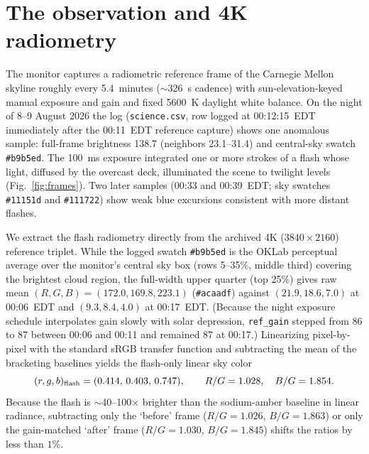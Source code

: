 \documentclass[11pt,a4paper]{article}
\newcommand{\code}[1]{\texttt{\small #1}}
\begin{document}
\section{The observation and 4K radiometry}
\label{sec:obs}
The monitor captures a radiometric reference frame of the Carnegie Mellon
skyline roughly every 5.4~minutes ($\sim$326~s cadence) with
sun-elevation-keyed manual exposure and gain and fixed 5600~K daylight white
balance. On the night of 8--9 August 2026 the log (\code{science.csv}, row
logged at 00:12:15~EDT immediately after the 00:11~EDT reference capture) shows
one anomalous sample: full-frame brightness 138.7 (neighbors 23.1--31.4) and
central-sky swatch \code{\#b9b5ed}. The 100~ms exposure integrated one or more
strokes of a flash whose light, diffused by the overcast deck, illuminated the
scene to twilight levels (Fig.~\ref{fig:frames}). Two later samples (00:33 and
00:39~EDT; sky swatches \code{\#11151d} and \code{\#111722}) show weak blue
excursions consistent with more distant flashes.

We extract the flash radiometry directly from the archived 4K
($3840\times 2160$) reference triplet. While the logged swatch \code{\#b9b5ed}
is the OKLab perceptual average over the monitor's central sky box (rows
5--35\%, middle third) covering the brightest cloud region, the full-width
upper quarter (top 25\%) gives raw mean $(R,G,B)=(172.0,169.8,223.1)$
(\code{\#acaadf}) against $(21.9,18.6,7.0)$ at 00:06~EDT and $(9.3,8.4,4.0)$
at 00:17~EDT. (Because the night exposure schedule interpolates gain slowly
with solar depression, \code{ref\_gain} stepped from 86 to 87 between 00:06
and 00:11 and remained 87 at 00:17.) Linearizing pixel-by-pixel with the
standard sRGB transfer function \citep{iec1999} and subtracting the mean of
the bracketing baselines yields the flash-only linear sky color
\begin{equation}
  (r,g,b)_{\rm flash} = (0.414,\,0.403,\,0.747), \qquad
  R/G = 1.028,\quad B/G = 1.854 .
  \label{eq:meas}
\end{equation}
Because the flash is $\sim$40--100$\times$ brighter than the sodium-amber
baseline in linear radiance, subtracting only the `before' frame
($R/G=1.026$, $B/G=1.863$) or only the gain-matched `after' frame
($R/G=1.030$, $B/G=1.845$) shifts the ratios by less than $1\%$.
\end{document}
